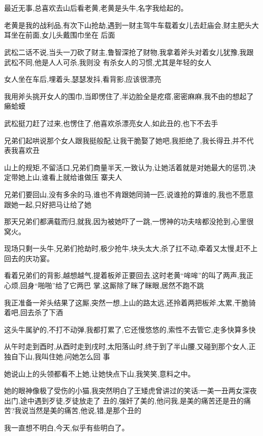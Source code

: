 ﻿\documentclass[12pt]{article}
\begin{document}
\section{}

最近无事,总喜欢去山后看老黄,老黄是头牛,名字我给起的。

老黄是我的战利品,有次下山抢劫,遇到一财主驾牛车载着女儿去赶庙会,财主肥头大耳坐在前面,女儿头戴围巾坐在
后面\dldots

武松二话不说,当头一刀砍了财主,鲁智深抢了财物,我拿着斧头对着女儿犹豫,我跟武松不同,他是人人可杀,我则没
有杀女人的习惯,尤其是年轻的女人\dldots

女人坐在车后,埋着头,瑟瑟发抖,看背影,应该很漂亮\dldots

我用斧头挑开女人的围巾,当即愣住了,半边脸全是疙瘩,密密麻麻,我不由的想起了癞蛤蟆\dldots

武松挺刀赶了过来,也愣住了,他喜欢杀漂亮女人,如此丑的,也下不去手

兄弟们起哄说那个女人跟我挺般配,让我干脆娶了她吧,我拒绝了,我长得丑,并不代表我喜欢丑

山上的规矩,不留活口,兄弟们商量半天,一致认为,让她活着就是对她最大的惩罚,决定带她上山,谁看上就给谁做压
寨夫人

兄弟们要回山,没有多余的马,谁也不肯跟她同骑一匹,说谁抢的算谁的,我也不愿意跟她一起,只好把马让给了她

那天兄弟们都满载而归,就我,因为被她吓了一跳,一愣神的功夫啥都没抢到,心里很窝火。

现场只剩一头牛,兄弟们抢劫时,极少抢牛,块头太大,杀了扛不动,牵着又太慢,赶不上回去的庆功宴。

看着兄弟们的背影,越想越气,提着板斧正要回去,这时老黄``哞哞''的叫了两声,我正心烦,回身``啪啪''给了它两巴
掌,这厮除了眯了眯眼,居然不跑不跳\dldots

我正准备一斧头结果了这厮,突然一想,上山的路太远,还拎着两把板斧,太累,干脆骑着吧,回去杀了下酒

这头牛属驴的,不打不动弹,我都打累了,它还慢悠悠的,索性不去管它,走多快算多快

从午时走到酉时,从酉时走到戌时,太阳落山时,终于到了半山腰,又碰到那个女人,正独自下山,我叫住她,问她怎么回
事

她说山上的头领都看不上她,让她快点下山,我笑笑,意料之中。

她的眼神像极了受伤的小猫,我突然明白了王矮虎曾讲过的笑话:一美一丑两女深夜出门,途中遇到歹徒,歹徒放走了
丑的,强奸了美的,他问我,是美的痛苦还是丑的痛苦?我说当然是美的痛苦,他说,错,是那个丑的\dldots

我一直想不明白,今天,似乎有些明白了。
\end{document}
